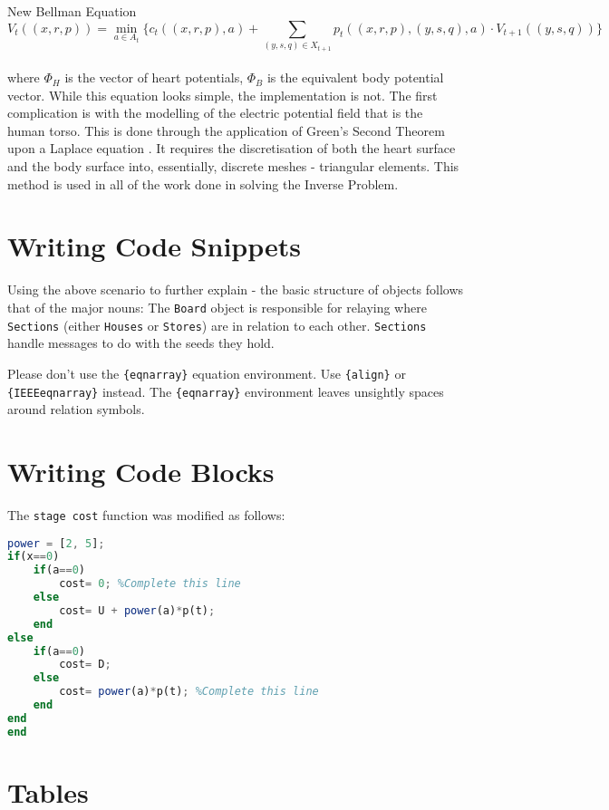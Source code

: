 \documentclass[10pt,a4paper,conference]{IEEEtran}
\begin{document}
	New Bellman Equation
	\begin{equation*}
	V_{t}((x,r,p)) 
	= \min_{a \in A_{t}}  
	 \bigg\{ c_{t}((x,r,p),a) 
			+ \sum_{(y,s,q) \in X_{t+1}} p_{t} ((x,r,p), (y,s,q), a) \cdot V_{t+1}((y,s,q)) \bigg\}
				\end{equation*}\\
	

where $\Phi_H$ is the vector of heart potentials, $\Phi_B$ is the equivalent body potential vector. While this equation looks simple, the implementation is not. The first complication is with the modelling of the electric potential field that is the human torso. This is done through the application of Green's Second Theorem upon a Laplace equation \cite{He2004}. It requires the discretisation of both the heart surface and the body surface into, essentially, discrete meshes - triangular elements. This method is used in all of the work done in solving the Inverse Problem.

\section{Writing Code Snippets}

Using the above scenario to further explain - the basic structure of objects follows that of the major nouns: The {\tt Board} object is responsible for relaying where {\tt Sections} (either {\tt Houses} or {\tt Stores}) are in relation to each other. {\tt Sections} handle messages to do with the seeds they hold. 

Please don't use the \verb|{eqnarray}| equation environment. Use
\verb|{align}| or \verb|{IEEEeqnarray}| instead. The \verb|{eqnarray}|
environment leaves unsightly spaces around relation symbols.

\section{Writing Code Blocks}
	The {\tt stage cost} function was modified as follows:
		\begin{lstlisting}[language=Octave]
power = [2, 5];
if(x==0)
    if(a==0)
        cost= 0; %Complete this line
    else
        cost= U + power(a)*p(t);
    end
else
    if(a==0)
        cost= D;
    else
        cost= power(a)*p(t); %Complete this line
    end
end
end
		\end{lstlisting}

\section{Tables}
\end{document}
